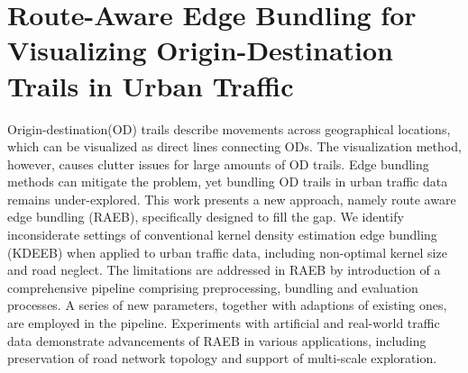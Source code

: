 \chapter{Route-Aware Edge Bundling for Visualizing Origin-Destination Trails in Urban Traffic}\label{chap:c2_intro}

Origin-destination(OD) trails describe movements across geographical locations, which can be visualized as direct lines connecting ODs.
The visualization method, however, causes clutter issues for large amounts of OD trails.
Edge bundling methods can mitigate the problem, yet bundling OD trails in urban traffic data remains under-explored.
This work presents a new approach, namely route aware edge bundling (RAEB), specifically designed to fill the gap.
We identify inconsiderate settings of conventional kernel density estimation edge bundling (KDEEB) when applied to urban traffic data, including non-optimal kernel size and road neglect.
The limitations are addressed in RAEB by introduction of a comprehensive pipeline comprising preprocessing, bundling and evaluation processes.
A series of new parameters, together with adaptions of existing ones, are employed in the pipeline.
Experiments with artificial and real-world traffic data demonstrate advancements of RAEB in various applications, including preservation of road network topology and support of multi-scale exploration.













